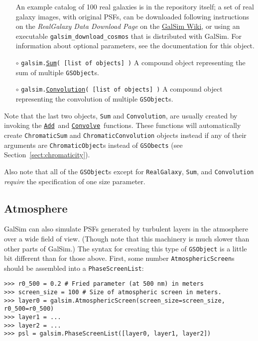 \documentclass[preprint,10pt]{../../devel/modules/aastex}
\newcommand\Add{\href{http://galsim-developers.github.io/GalSim/namespacegalsim_1_1compound.html\#ad3f305087db1b740376666d9c022d94e}{\texttt{Add}}}
\newcommand\Convolve{\href{http://galsim-developers.github.io/GalSim/namespacegalsim_1_1compound.html\#a17ccb8acb75a4eb6e35e791e4177957b}{\texttt{Convolve}}}
\begin{document}
\begin{itemize}
    An example catalog of 100 real galaxies is in the repository itself; a set of real
    galaxy images, with original PSFs, can be downloaded following instructions on the
    \emph{RealGalaxy Data Download Page} on the
    \href{https://github.com/GalSim-developers/GalSim/wiki/RealGalaxy\%20Data}{GalSim Wiki}, or
    using an executable \texttt{galsim\_download\_cosmos} that is distributed with GalSim. For information
    about  optional parameters, see the documentation for this object.
\item[$\circ$]
  \texttt{galsim.}\href{http://galsim-developers.github.io/GalSim/classgalsim_1_1compound_1_1_sum.html}{\texttt{Sum}}\texttt{( [list of objects] )}
    \newline
    A {compound} object representing the sum of multiple \texttt{GSObject}s.
\item[$\circ$]
  \texttt{galsim.}\href{http://galsim-developers.github.io/GalSim/classgalsim_1_1compound_1_1_convolution.html}{\texttt{Convolution}}\texttt{( [list of objects] )}
    \newline
    A compound object representing the convolution of multiple \texttt{GSObject}s.
\end{itemize}

Note that the last two objects, \texttt{Sum} and \texttt{Convolution}, are usually created by
invoking the \Add\ and \Convolve\ functions.  These functions will
automatically create \texttt{ChromaticSum} and \texttt{ChromaticConvolution} objects instead if
any of their arguments are \texttt{ChromaticObject}s instead of
\texttt{GSObects} (see Section~\ref{sect:chromaticity}).

Also note that all of the \texttt{GSObject}s except for \texttt{RealGalaxy}, \texttt{Sum}, and
\texttt{Convolution} {\em require} the specification of one size
parameter.

\subsection{Atmosphere}
GalSim can also simulate PSFs generated by turbulent layers in the atmosphere over a wide field of
view.  (Though note that this machinery is much slower than other parts of GalSim.) The syntax for
creating this type of \texttt{GSObject} is a little bit different than for those above.  First, some
number \texttt{AtmosphericScreen}s should be assembled into a \texttt{PhaseScreenList}:

\begin{verbatim}
>>> r0_500 = 0.2 # Fried parameter (at 500 nm) in meters
>>> screen_size = 100 # Size of atmospheric screen in meters.
>>> layer0 = galsim.AtmosphericScreen(screen_size=screen_size, r0_500=r0_500)
>>> layer1 = ...
>>> layer2 = ...
>>> psl = galsim.PhaseScreenList([layer0, layer1, layer2])
\end{verbatim}
\end{document}
